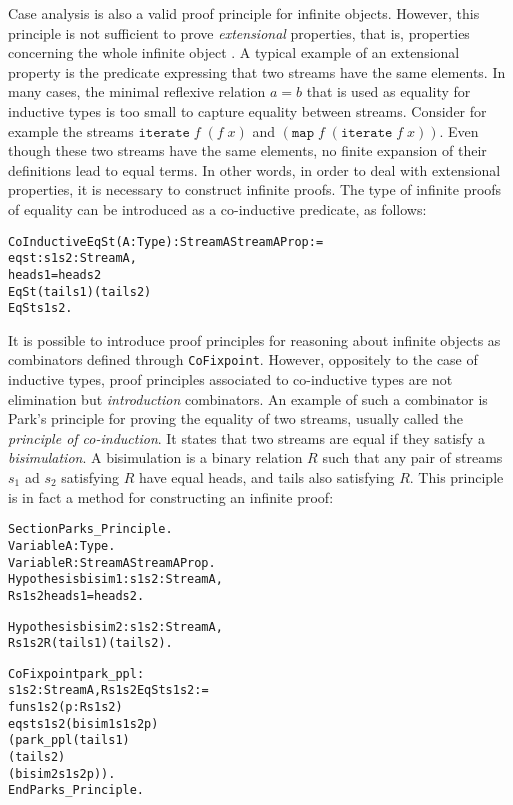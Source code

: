 \documentclass[11pt]{article}
\begin{document}
Case analysis is also a valid proof principle for infinite
objects. However, this principle is not sufficient to prove
\textsl{extensional} properties, that is, properties concerning the
whole infinite object \cite{EG95a}. A typical example of an
extensional property is the predicate expressing that two streams have
the same elements. In many cases, the minimal reflexive relation $a=b$
that is used as equality for inductive types is too small to capture
equality between streams. Consider for example the streams
$\texttt{iterate}\;f\;(f\;x)$ and
$(\texttt{map}\;f\;(\texttt{iterate}\;f\;x))$. Even though these two streams have
the same elements, no finite expansion of their definitions lead to
equal terms. In other words, in order to deal with extensional
properties, it is necessary to construct infinite proofs. The type of
infinite proofs of equality can be introduced as a co-inductive
predicate, as follows:
\begin{alltt}
CoInductive EqSt (A: Type) : Stream A {\arrow} Stream A {\arrow} Prop :=
  eqst : {\prodsym} s1 s2: Stream A,
      head s1 = head s2 {\arrow}
      EqSt (tail s1) (tail s2) {\arrow}
      EqSt s1 s2.
\end{alltt}

It is possible to introduce proof principles for reasoning about
infinite objects as combinators defined through
\texttt{CoFixpoint}. However, oppositely to the case of inductive
types, proof principles associated to co-inductive types are not
elimination but \textsl{introduction} combinators. An example of such
a combinator is Park's principle for proving the equality of two
streams, usually called the \textsl{principle of co-induction}. It
states that two streams are equal if they satisfy a
\textit{bisimulation}.  A bisimulation is a binary relation $R$ such
that any pair of streams $s_1$ ad $s_2$ satisfying $R$ have equal
heads, and tails also satisfying $R$.  This principle is in fact a
method for constructing an infinite proof:

\begin{alltt}
Section Parks_Principle.
Variable A : Type.
Variable    R      : Stream A {\arrow} Stream A {\arrow} Prop.
Hypothesis  bisim1 : {\prodsym} s1 s2:Stream A, 
                       R s1 s2 {\arrow} head s1 = head s2.

Hypothesis  bisim2 : {\prodsym} s1 s2:Stream A, 
                       R s1 s2 {\arrow} R (tail s1) (tail s2).

CoFixpoint park_ppl     : 
 {\prodsym} s1 s2:Stream A, R s1 s2 {\arrow} EqSt s1 s2 :=
 fun s1 s2 (p : R s1 s2) {\funarrow}
      eqst s1 s2 (bisim1 s1 s2 p) 
                 (park_ppl (tail s1) 
                           (tail s2) 
                           (bisim2 s1 s2 p)).
End Parks_Principle.
\end{alltt}
\end{document}
